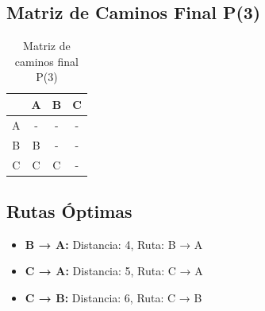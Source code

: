 \documentclass[12pt]{article}
\begin{document}
\clearpage
\subsection{Matriz de Caminos Final P(3)}
\begin{table}[h!]
\centering
\begin{tabular}{|c|c|c|c|}
\hline
 & A & B & C \\\hline
A & - & - & - \\\hline
B & B & - & - \\\hline
C & C & C & - \\\hline
\end{tabular}
\caption{Matriz de caminos final P(3)}
\end{table}

\clearpage
\subsection{Rutas Óptimas}
\begin{itemize}
\item \textbf{B → A:} Distancia: 4, Ruta: B → A
\item \textbf{C → A:} Distancia: 5, Ruta: C → A
\item \textbf{C → B:} Distancia: 6, Ruta: C → B
\end{itemize}
\end{document}
